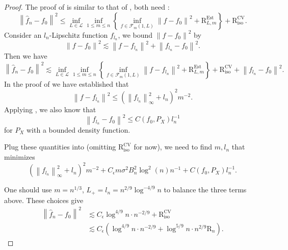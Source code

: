 \documentclass[10pt,a4paper]{amsart}
\begin{document}
\begin{proof}
The proof of  is similar to that of , both need :
\begin{equation*}
\left\|\widehat{f}_n-f_0\right\|^2 \leq \inf _{L \in \mathcal{L}} \inf _{1 \leq m \leq n}\left\{\inf _{f \in \mathcal{F}_m(1, L)}\left\|f-f_0\right\|^2+\mathrm{R}_{L,m}^{\mathrm{Est}}\right\}+\mathrm{R}_{\mathrm{iso}}^{\mathrm{CV}}.
\end{equation*}
Consider an $l_n$-Lipschitz function $f_{l_n}$, we bound $\left\|f-f_0\right\|^2$ by
\begin{equation*}
\left\|f-f_0\right\|^2 \lesssim\left\|f-f_{l_n}\right\|^2+\left\|f_{l_n}-f_0\right\|^2.
\end{equation*}
Then we have 
\begin{equation}\label{eq: bv before plug in}
\left\|\widehat{f}_n-f_0\right\|^2 \lesssim \inf _{L \in \mathcal{L}} \inf _{1 \leq m \leq n}\left\{\inf _{f \in \mathcal{F}_m(1, L)}\left\|f-f_{l_n}\right\|^2+\mathrm{R}_{L,m}^{\mathrm{Est}}\right\}+\mathrm{R}_{\mathrm{iso}}^{\mathrm{CV}}+\left\|f_{l_n}-f_0\right\|^2.
\end{equation}
In the proof of  we have established that 
\begin{equation*}
\left\|f-f_{l_n}\right\|^2 \leq\left(\left\|f_{l_n}\right\|_{\infty}^2+l_n\right)^2 m^{-2}.
\end{equation*}
Applying , we also know that 
\begin{equation*}
\left\|f_{l_n}-f_0\right\|^2 \leq C\left(f_0, P_X\right) l_n^{-1}
\end{equation*}
for $P_X$ with a bounded density function.

Plug these quantities into  (omitting $\mathrm{R}_{\text {iso }}^{\mathrm{CV}}$ for now), we need to find $m,l_n$ that minimizes
\begin{equation*}
\left(\left\|f_{l_n}\right\|_{\infty}^2+l_n\right)^2 m^{-2}+C_\epsilon m \sigma^2 B_n^2 \log ^2(n) n^{-1}+C\left(f_0, P_X\right) l_n^{-1} .
\end{equation*}

One should use $m = n^{1/3}$, $L_+ = l_n = n^{2/9}\log^{-4/9} n$ to balance the three terms above. These choices give
\begin{equation*}
\begin{aligned}
\left\|\widehat{f}_n-f_0\right\|^2 & \lesssim C_\epsilon \log ^{4 / 9} n \cdot n^{-2 / 9}+\mathrm{R}_{\mathrm{iso}}^{\mathrm{CV}} \\
& \lesssim C_\epsilon\left(\log ^{4 / 9} n \cdot n^{-2 / 9}+\log ^{5 / 9} n \cdot n^{2 / 9} \mathrm{R}_n\right).
\end{aligned}
\end{equation*}
\end{proof}
\end{document}
